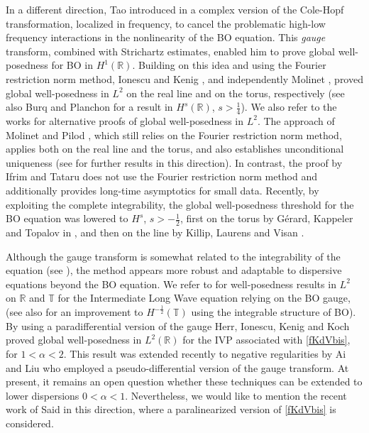 \documentclass{amsart}
\theoremstyle{definition}
\theoremstyle{remark}
\numberwithin{equation}{section}
\begin{document}
In a different direction, Tao introduced in \cite{Tao04} a complex version of the Cole-Hopf transformation, localized in frequency, to cancel the problematic high-low frequency interactions in the nonlinearity of the BO equation.  This \emph{gauge} transform, combined with Strichartz estimates, enabled him to prove global well-posedness for BO in $H^1(\mathbb R)$. Building on this idea and using the Fourier restriction norm method, Ionescu and Kenig \cite{IK07}, and independently Molinet \cite{Mo07,Mo08}, proved global well-posedness in $L^2$ on the real line and on the torus, respectively (see also Burq and Planchon \cite{BuPl08} for a result in  $H^s(\mathbb R)$, $s>\frac14$). We also refer to the works \cite{MoPi12, IfTa19} for alternative proofs of global well-posedness in $L^2$. The approach of Molinet and Pilod \cite{MoPi12}, which still relies on the Fourier restriction norm method, applies both on the real line and the torus, and also establishes unconditional uniqueness (see \cite{Kishi22,MoPi23} for further results in this direction). In contrast, the proof by Ifrim and Tataru \cite{IfTa19} does not use the Fourier restriction norm method and additionally provides long-time asymptotics for small data. 
Recently, by exploiting the complete integrability, the global well-posedness threshold for the BO equation was lowered to $H^s$, $s>-\frac12$, first on the torus by G\'erard, Kappeler and Topalov in \cite{GKT23}, and then on the line by Killip, Laurens and Visan \cite{KiLaVi24}.

Although the gauge transform is somewhat related to the integrability of the equation (see \cite{GKT24}), the method appears more robust and adaptable to dispersive equations beyond the BO equation. We refer to \cite{Ifsa25,CLOP24} for well-posedness results in $L^2$ on $\mathbb R$ and $\mathbb T$ for the Intermediate Long Wave equation relying on the BO gauge, (see also \cite{GaLa25} for an improvement to $H^{-\frac12}(\mathbb T)$ using the integrable structure of BO). By using a paradifferential version of the gauge Herr, Ionescu, Kenig and Koch \cite{HIKK10} proved global well-posedness in $L^2(\mathbb R)$ for the IVP associated with \eqref{fKdVbis}, for $1<\alpha<2$. This result was extended recently to negative regularities by Ai and Liu \cite{AiLiu24} who employed a pseudo-differential version of the gauge transform. At present, it remains an open question whether these techniques can be extended to lower dispersions  $0<\alpha<1$. Nevertheless, we would like to mention the recent work of Said \cite{Said23} in this direction, where a paralinearized version of \eqref{fKdVbis} is considered. 
\end{document}
